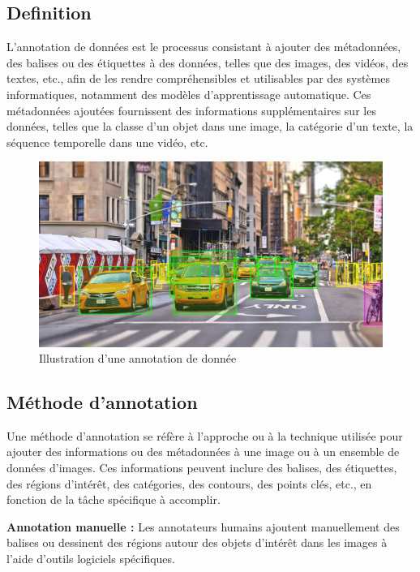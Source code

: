 \subsection{Definition}
\quad L'annotation de données est le processus consistant à ajouter des métadonnées, des balises ou des étiquettes à des données, telles que des images, des vidéos, des textes, etc., afin de les rendre compréhensibles et utilisables par des systèmes informatiques, notamment des modèles d'apprentissage automatique. Ces métadonnées ajoutées fournissent des informations supplémentaires sur les données, telles que la classe d'un objet dans une image, la catégorie d'un texte, la séquence temporelle dans une vidéo, etc.


\begin{figure}[htbp]
	\begin{center}
		\begin{minipage}[b]{0.7\textwidth}
			\centering
			\includegraphics[width=\textwidth]{images/13.jpeg}
			\caption{Illustration d'une annotation de donnée}
		\end{minipage}
	\end{center}
\end{figure}

\subsection{Méthode d'annotation}
\quad Une méthode d'annotation se réfère à l'approche ou à la technique utilisée pour ajouter des informations ou des métadonnées à une image ou à un ensemble de données d'images. Ces informations peuvent inclure des balises, des étiquettes, des régions d'intérêt, des catégories, des contours, des points clés, etc., en fonction de la tâche spécifique à accomplir.

\textemdash \textbf{ Annotation manuelle : }Les annotateurs humains ajoutent manuellement des balises ou dessinent des régions autour des objets d'intérêt dans les images à l'aide d'outils logiciels spécifiques.

